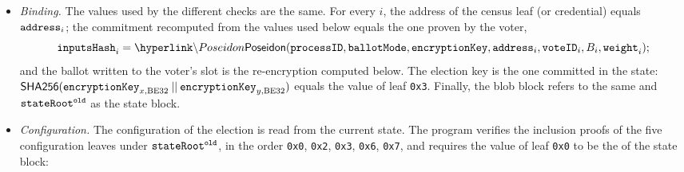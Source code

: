 \begin{itemize}
		\begin{itemize}
			\item If the census is a Merkle tree ($\censusorigin \in \{1,2,3\}$), then for every $i$ the program verifies a Merkle membership proof of the leaf $\address_i \cdot 2^{88} + \weight_i$ (Eq.~\eqref{eq:census-leaf}),
			\[
			\hlget{\censusTree}.\hlget{\MTVerify}\big(\address_i \cdot 2^{88} + \weight_i, \idx_i, \censuspf_i, \censusroot\big) = \true,
			\]
			where $\idx_i$ is the position carried by the proof; all proofs share the same root, which is published as \censusroot, no leaf appears twice, and every path has a canonical shape (at most 61 siblings, and no index bit beyond the path length).
			\item If $\censusorigin = 4$ (\ac{CSP}), then for every $i$ the program recovers a public key from the credential over the message of Eq.~\eqref{eq:csp-message} and requires all credentials of the batch to recover the same key, whose address is published as \censusroot:
			\begin{gather*}
			\pk^{\mathsf{CSP}} = \hlget{\SPubKey}\big((\processid, \address_i, \weight_i, \idx_i), \censuspf_i\big),\\ \censusroot = \mathsf{low\text{-}20}\bigl(\hlget{\Keccak}(\pk^{\mathsf{CSP}})\bigr).
			\end{gather*}
			Addresses must be canonical 160-bit integers, and no address and no index may appear twice in the batch.
		\end{itemize}
		\item \emph{Binding.} The values used by the different checks are the same. For every $i$, the address of the census leaf (or credential) equals $\texttt{address}_i$; the commitment recomputed from the values used below equals the one proven by the voter,
			\[\ballotinputshash_i = \hlget{\Poseidon}(\processid, \ballotmode, \epk, \address_i, \voteid_i, B_i, \weight_i);\]
		and the ballot written to the voter's slot is the re-encryption computed below. The election key is the one committed in the state: ${\sf{SHA256}}(\texttt{encryptionKey}_{x,\text{BE32}} \:||\: \texttt{encryptionKey}_{y,\text{BE32}})$ equals the value of leaf \texttt{0x3}. Finally, the blob block refers to the same \processid and $\texttt{stateRoot}^\texttt{old}$ as the state block.
		\item \emph{Configuration.} The configuration of the election is read from the current state. The program verifies the inclusion proofs of the five configuration leaves under $\texttt{stateRoot}^\texttt{old}$, in the order \texttt{0x0}, \texttt{0x2}, \texttt{0x3}, \texttt{0x6}, \texttt{0x7}, and requires the value of leaf \texttt{0x0} to be the \processid of the state block:

\end{itemize}
